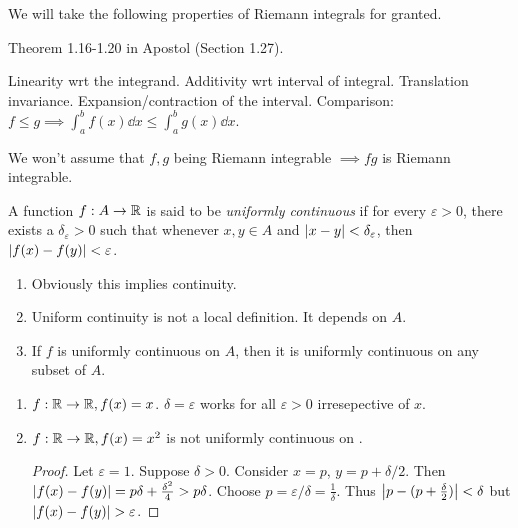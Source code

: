 
We will take the following properties of Riemann integrals for granted.

Theorem 1.16-1.20 in Apostol (Section 1.27).
\begin{outline}
    \1 Linearity wrt the integrand.
    \1 Additivity wrt interval of integral.
    \1 Translation invariance.
    \1 Expansion/contraction of the interval.
    \1 Comparison: $f \leq g \implies \int_{a}^{b} f(x) \dd x \leq \int_{a}^{b} g(x) \dd x$.
\end{outline}

We won't assume that $f, g$ being Riemann integrable $\implies fg$ is Riemann integrable.

\begin{defn} \label{defn:uniformly continuous}
    A function $f : A \to \mathbb{R}$ is said to be \emph{uniformly continuous} if for every $\varepsilon > 0$, there exists a $\delta_{\varepsilon} > 0$ such that whenever $x, y \in A$ and $\abs{x - y} < \delta_{\varepsilon}$, then $\abs{f(x) - f(y)} < \varepsilon$.
\end{defn}
\begin{rem} \leavevmode
    \begin{enumerate}[label=(\alph*)]
        \item Obviously this implies continuity.
        \item Uniform continuity is not a local definition. It depends on $A$.
        \item If $f$ is uniformly continuous on $A$, then it is uniformly continuous on any subset of $A$.
    \end{enumerate}
\end{rem}

\begin{example} \leavevmode
    \begin{enumerate}[label=(\alph*)]
        \item $f : \mathbb{R} \to \mathbb{R}, f(x) = x$. $\delta = \varepsilon$ works for all $\varepsilon > 0$ irresepective of $x$.
        \item $f : \mathbb{R} \to \mathbb{R}, f(x) = x^{2}$ is not uniformly continuous on \R.
        \begin{proof}
            Let $\varepsilon = 1$. Suppose $\delta > 0$. Consider $x = p$, $y = p + \delta/2$. Then $\abs{f(x) - f(y)} = p \delta + \frac{\delta^{2}}{4} > p \delta$.
            Choose $p = \varepsilon / \delta = \frac{1}{\delta}$. Thus $\abs{p - (p + \frac{\delta}{2})} < \delta$ but $\abs{f(x) - f(y)} > \varepsilon$. 
        \end{proof}
    \end{enumerate}
\end{example}

